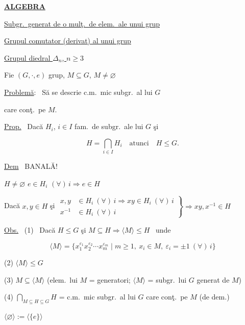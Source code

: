 \documentclass[12pt]{article}
\begin{document}
\begin{center}
\underline{\textbf{ALGEBRA}} \hfill {}\\[4pt]
\end{center}

\bigskip
\noindent\underline{Subgr.\ generat de o mulţ.\ de elem.\ ale unui grup}

\noindent\underline{Grupul comutator (derivat) al unui grup}

\noindent\underline{Grupul diedral $\Delta_n$, $n\geq 3$}

\bigskip
\bigskip
\noindent Fie $(G,\cdot,e)$ grup, $M\subseteq G$, $M\neq\varnothing$

\noindent\underline{Problemă}: \ Să se descrie c.m.\ mic subgr.\ al lui $G$

\noindent care conţ.\ pe $M$.

\bigskip
\noindent\underline{Prop.} \ Dacă $H_i$, $i\in I$ fam.\ de subgr.\ ale lui $G$ şi

\[
H=\bigcap_{i\in I} H_i \quad \text{atunci} \quad H\leq G.
\]

\bigskip
\noindent\underline{Dem} \ BANALĂ!

\noindent $H\neq\varnothing$ \quad $e\in H_i$ $(\forall)\,i \Rightarrow e\in H$

\noindent Dacă $x,y\in H$ şi $\left.\begin{aligned}x,y&\in H_i\ (\forall)\,i \Rightarrow xy\in H_i\ (\forall)\,i\\ x^{-1}&\in H_i\ (\forall)\,i\end{aligned}\right\} \Rightarrow xy,x^{-1}\in H$

\bigskip
\noindent\underline{Obs.} \ (1) \ Dacă $H\leq G$ şi $M\subseteq H \Rightarrow \langle M\rangle \leq H$ \ unde

\[
\langle M\rangle = \{x_1^{\varepsilon_1}x_2^{\varepsilon_2}\cdots x_m^{\varepsilon_m} \mid m\geq 1,\ x_i\in M,\ \varepsilon_i=\pm 1\ (\forall)\,i\}
\]

\noindent (2) $\langle M\rangle \leq G$

\noindent (3) $M\subseteq \langle M\rangle$ \quad (elem.\ lui $M$ = generatori; $\langle M\rangle$ = subgr.\ lui $G$ generat de $M$)

\noindent (4) $\displaystyle\bigcap_{M\subseteq H\subseteq G} H$ = c.m.\ mic subgr.\ al lui $G$ care conţ.\ pe $M$ \quad (de dem.)

\bigskip
\noindent $\langle\varnothing\rangle := \langle\{e\}\rangle$
\end{document}
